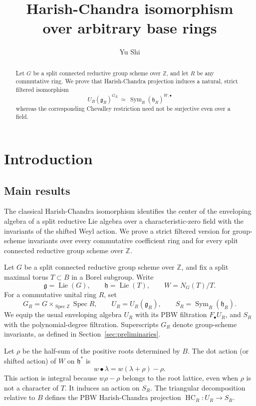\documentclass[twoside,a4paper,12pt,reqno]{amsart}
\title[Harish-Chandra isomorphism over arbitrary base rings]{Harish-Chandra isomorphism\\
over arbitrary base rings}
\author{Yu Shi}
\theoremstyle{remark}
\numberwithin{equation}{section}
\newcommand{\Z}{\mathbb Z}
\newcommand{\fg}{\mathfrak g}
\newcommand{\fh}{\mathfrak h}
\DeclareMathOperator{\Sym}{Sym}
\DeclareMathOperator{\Lie}{Lie}
\DeclareMathOperator{\HC}{HC}
\DeclareMathOperator{\Spec}{Spec}
\begin{document}
\begin{abstract}
Let \(G\) be a split connected reductive group scheme over \(\Z\), and let \(R\) be any commutative ring. We prove that Harish-Chandra projection induces a natural, strict filtered isomorphism
\[
U_R(\fg_R)^{G_R}\ \simeq\ \Sym_R(\fh_R)^{W,\bullet}
\]
whereas the corresponding Chevalley restriction need not be surjective even over a field. 

\end{abstract}

\maketitle

\tableofcontents


\section{Introduction}\label{sec:introduction}

\subsection{Main results}

The classical Harish-Chandra isomorphism identifies the center of the enveloping algebra of a split reductive Lie algebra over a characteristic-zero field with the invariants of the shifted Weyl action. We prove a strict filtered version for group-scheme invariants over every commutative coefficient ring and for every split connected reductive group scheme over \(\Z\).

Let \(G\) be a split connected reductive group scheme over \(\Z\), and fix a split maximal torus \(T\subset B\) in a Borel subgroup. Write
\[
\fg=\Lie(G),\qquad \fh=\Lie(T),\qquad W=N_G(T)/T.
\]
For a commutative unital ring \(R\), set
\[
G_R=G\times_{\Spec\Z}\Spec R,\qquad
U_R=U_R(\fg_R),\qquad S_R=\Sym_R(\fh_R).
\]
We equip the usual enveloping algebra \(U_R\) with its PBW filtration \(F_\bullet U_R\), and \(S_R\) with the polynomial-degree filtration. Superscripts \(G_R\) denote group-scheme invariants, as defined in Section~\ref{sec:preliminaries}.

Let \(\rho\) be the half-sum of the positive roots determined by \(B\). The dot action (or shifted action) of \(W\) on \(\fh^*\) is
\[
w\bullet\lambda=w(\lambda+\rho)-\rho.
\]
This action is integral because \(w\rho-\rho\) belongs to the root lattice, even when \(\rho\) is not a character of \(T\). It induces an action on \(S_R\). The triangular decomposition relative to \(B\) defines the PBW Harish-Chandra projection \(\HC_R:U_R\to S_R\).
\end{document}

